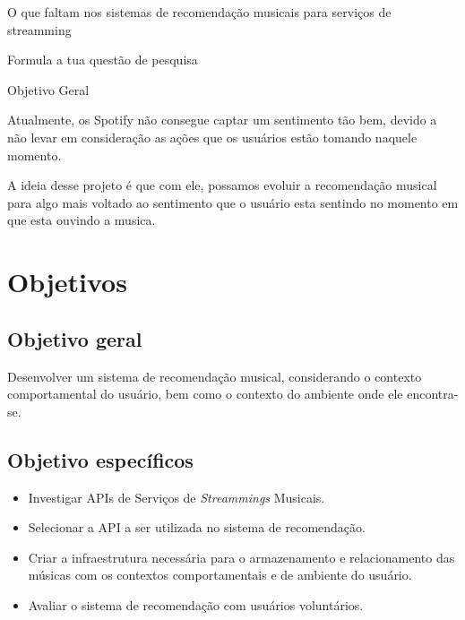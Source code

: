 \documentclass{article}
\begin{document}






O que faltam nos sistemas de recomendação musicais para serviços de streamming


Formula a tua questão de pesquisa


Objetivo Geral


Atualmente, os Spotify não consegue captar um sentimento tão bem, devido a não levar em consideração as ações que os usuários estão tomando naquele momento. 

A ideia desse projeto é que com ele, possamos evoluir a recomendação musical para algo mais voltado ao sentimento que o usuário esta sentindo no momento em que esta ouvindo a musica.

\newpage

\section{Objetivos}

\subsection{Objetivo geral}

Desenvolver um sistema de recomendação musical, considerando o contexto comportamental do usuário, bem como o contexto do ambiente onde ele encontra-se.

\subsection{Objetivo específicos}

\begin{itemize}
\item Investigar APIs de Serviços de \textit{Streammings} Musicais.

\item Selecionar a API a ser utilizada no sistema de recomendação.

\item Criar a infraestrutura necessária para o armazenamento e relacionamento das músicas com os contextos comportamentais e de ambiente do usuário.

\item Avaliar o sistema de recomendação com usuários voluntários.

\end{itemize}
\end{document}
